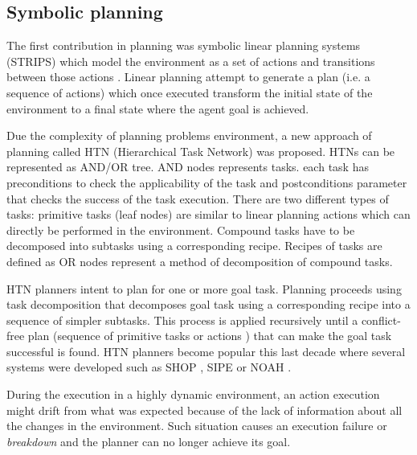 \documentclass[conference]{IEEEtran}
\begin{document}
	\subsection{Symbolic planning}
	\label{sec:symbolic}
	The first contribution in planning was symbolic linear planning systems (STRIPS)\cite{fikes1972strips} which model the environment as a set of actions and transitions between those actions . Linear planning attempt to generate a plan (i.e. a sequence of actions) which once executed transform the initial state of the environment to a final state where the agent goal is achieved. 
%	
	\par Due the complexity of planning problems environment, a new approach of planning called  HTN (Hierarchical Task Network)  \cite{erol1996hierarchical} was proposed. 	
	  HTNs can be represented as AND/OR tree. AND nodes represents tasks. each task has preconditions to check the applicability of the task and postconditions parameter that checks the success of the task execution. There are two different types of tasks: primitive tasks (leaf nodes) are similar to linear planning actions which can directly be performed in the environment. Compound tasks have to be decomposed into subtasks using a corresponding recipe.    Recipes of tasks are defined as OR nodes represent a method of decomposition of compound tasks. 
	\par  HTN planners intent to plan for one or more goal task. Planning proceeds using task decomposition that decomposes goal task  using a corresponding recipe into a sequence of simpler subtasks. This process is applied recursively until a conflict-free plan (sequence of primitive tasks or actions ) that can make the goal task successful is found. 
	HTN planners become popular this last decade  where several systems were developed such as SHOP \cite{nau1999shop}, SIPE \cite{wilkins1988practical} or NOAH  \cite{sacerdoti1975structure}. 
	\par During the execution in a highly dynamic environment, an action execution might drift from what was expected because of the lack of information about all the changes in the environment. Such situation causes an execution failure or \emph{breakdown} and the planner can no longer achieve its goal. 
\end{document}
